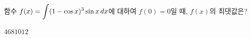 함수 $f(x)=\displaystyle\int(1-\cos x)^3\sin x\mkern3mu dx$에 대하여 $f(0)=0$일 때, $f(x)$의 최댓값은?
\begin{choices32}{$4$}{$6$}{$8$}{$10$}{$12$}\end{choices32}
